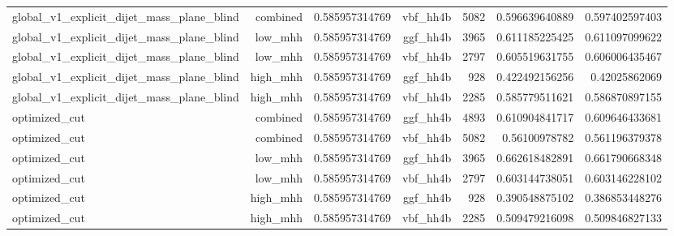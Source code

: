 \begin{table}[htbp]
{\begin{tabular}{lrrrrrr}
global\_v1\_explicit\_dijet\_mass\_plane\_blind & combined & 0.585957314769 & vbf\_hh4b & 5082 & 0.596639640889 & 0.597402597403 \\
global\_v1\_explicit\_dijet\_mass\_plane\_blind & low\_mhh & 0.585957314769 & ggf\_hh4b & 3965 & 0.611185225425 & 0.611097099622 \\
global\_v1\_explicit\_dijet\_mass\_plane\_blind & low\_mhh & 0.585957314769 & vbf\_hh4b & 2797 & 0.605519631755 & 0.606006435467 \\
global\_v1\_explicit\_dijet\_mass\_plane\_blind & high\_mhh & 0.585957314769 & ggf\_hh4b & 928 & 0.422492156256 & 0.42025862069 \\
global\_v1\_explicit\_dijet\_mass\_plane\_blind & high\_mhh & 0.585957314769 & vbf\_hh4b & 2285 & 0.585779511621 & 0.586870897155 \\
optimized\_cut & combined & 0.585957314769 & ggf\_hh4b & 4893 & 0.610904841717 & 0.609646433681 \\
optimized\_cut & combined & 0.585957314769 & vbf\_hh4b & 5082 & 0.56100978782 & 0.561196379378 \\
optimized\_cut & low\_mhh & 0.585957314769 & ggf\_hh4b & 3965 & 0.662618482891 & 0.661790668348 \\
optimized\_cut & low\_mhh & 0.585957314769 & vbf\_hh4b & 2797 & 0.603144738051 & 0.603146228102 \\
optimized\_cut & high\_mhh & 0.585957314769 & ggf\_hh4b & 928 & 0.390548875102 & 0.386853448276 \\
optimized\_cut & high\_mhh & 0.585957314769 & vbf\_hh4b & 2285 & 0.509479216098 & 0.509846827133 \\
\bottomrule
\end{tabular}
}
\end{table}
